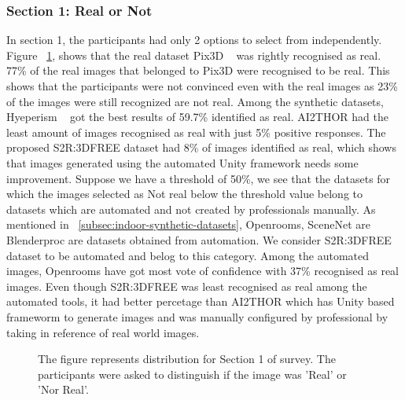 \subsubsection{Section 1: Real or Not}
In section 1, the participants had only 2 options to select from independently.
Figure ~\ref{fig:question1}, shows that the real dataset Pix3D ~\cite{pix3d} was rightly recognised as real.
77\% of the real images that belonged to Pix3D were recognised to be real.
This shows that the participants were not convinced even with the real images as 23\% of the images were still recognized are not real.
Among the synthetic datasets, Hyeperism ~\cite{Roberts2020HypersimAP} got the best results of 59.7\% identified as real.
AI2THOR had the least amount of images recognised as real with just 5\% positive responses.
The proposed S2R:3DFREE dataset had 8\% of images identified as real, which shows that images generated using the automated Unity framework needs some improvement.
Suppose we have a threshold of 50\%, we see that the datasets for which the images selected as Not real below the threshold value belong to datasets which are automated and not created by professionals manually.
As mentioned in ~\ref{subsec:indoor-synthetic-datasets}, Openrooms, SceneNet are Blenderproc are datasets obtained from automation.
We consider S2R:3DFREE dataset to be automated and belog to this category.
Among the automated images, Openrooms have got most vote of confidence with 37\% recognised as real images.
Even though S2R:3DFREE was least recognised as real among the automated tools, it had better percetage than AI2THOR which has Unity based frameworm to generate images and was manually configured by professional by taking in reference of real world images.

\begin{figure}
    \centering
    \resizebox{\textwidth}{!}{}
    \caption{The figure represents distribution for Section 1 of survey. The participants were asked to distinguish if the image was 'Real' or 'Nor Real'.}
    \label{fig:question1}
\end{figure}

